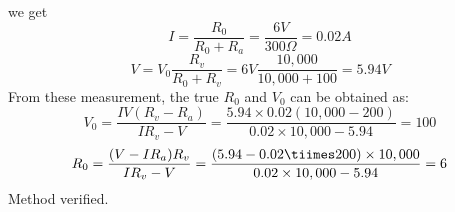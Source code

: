 \begin{itemize}
  we get
  \[ I=\frac{R_0}{R_0+R_a}=\frac{6V}{300\Omega}=0.02A \]
  \[ V=V_0 \frac{R_v}{R_0+R_v}=6V \frac{10,000}{10,000+100}=5.94 V \]
  From these measurement, the true $R_0$ and $V_0$ can be obtained as:
  \[ V_0=\frac{IV(R_v-R_a)}{IR_v-V}
  =\frac{5.94\times 0.02(10,000-200)}{0.02\times 10,000-5.94}=100 \]
  \[ R_0=\frac{(V-IR_a)R_v}{IR_v-V} 
  =\frac{(5.94-0.02\tiimes 200)\times 10,000}{0.02\times 10,000-5.94}=6 \]
  Method verified.

\begin{comment}
\item {\bf Example 1:}

  The load voltage is related to the voltage source by
  \[ V_L=V_0 \frac{R_L}{R_L+R_0} \]
  i.e., 
  \[ R_L V_0-V_L R_0 = V_L R_L \]
  Using the values of $R_L$ and $V_L$ of the two experiments, we get
  \[ \left\{ \begin{array}{l} 
    1000 V_0-9.09 R_0 = 9,090 \\
    2000 V_0-9.52 R_0 =19,040 \end{array} \right. \]
  Solving these two equations we get
  \[ \left\{ \begin{array}{l} 
    R_0=100\Omega \\ V_0=10 V \end{array} \right. \]
\end{comment}

\end{itemize}



